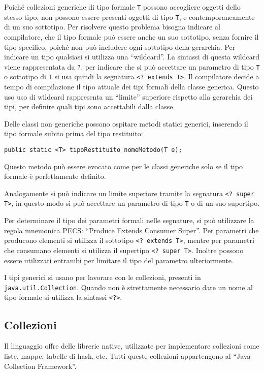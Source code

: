 \documentclass{article}
\numberwithin{equation}{subsection}
\begin{document}
Poiché collezioni generiche di tipo formale \verb|T| possono accogliere oggetti dello stesso tipo, non possono essere presenti oggetti di tipo \verb|T|, e contemporaneamente di un suo 
sottotipo. Per risolvere questo problema bisogna indicare al compilatore, che il tipo formale può essere anche un suo sottotipo, senza fornire il tipo specifico, poiché non può 
includere ogni sottotipo della gerarchia. Per indicare un tipo qualsiasi si utilizza una ``wildcard''. 
La sintassi di questa wildcard viene rappresentata da \verb|?|, per indicare che si può accettare un parametro di tipo \verb|T| o sottotipo di \verb|T| si usa quindi la 
segnatura \verb|<? extends T>|. 
Il compilatore decide a tempo di compilazione il tipo attuale dei tipi formali della classe generica. Questo uso uso di wildcard rappresenta un ``limite'' superiore 
rispetto alla gerarchia dei tipi, per definire quali tipi sono accettabili dalla classe. 

Delle classi non generiche possono ospitare metodi statici generici, inserendo il tipo formale subito prima del tipo restituito:
\begin{verbatim}
public static <T> tipoRestituito nomeMetodo(T e);
\end{verbatim}
Questo metodo può essere evocato come per le classi generiche solo se il tipo formale è perfettamente definito.  

Analogamente si può indicare un limite superiore tramite la segnatura \verb|<? super T>|, in questo modo si può accettare un parametro di tipo \verb|T| o di un suo 
supertipo. 

Per determinare il tipo dei parametri formali nelle segnature, si può utilizzare la regola mnemonica PECS: ``Produce Extends Consumer Super''. Per parametri che producono elementi 
si utilizza il sottotipo \verb|<? extends T>|, mentre per parametri che consumano elementi si utilizza il supertipo \verb|<? super T>|. 
Inoltre possono essere utilizzati entrambi per limitare il tipo del parametro ulteriormente. 

I tipi generici si usano per lavorare con le collezioni, presenti in \verb|java.util.Collection|. Quando non è strettamente necessario dare un nome al tipo formale si utilizza la 
sintassi \verb|<?>|. 

\subsection{Collezioni}

Il linguaggio offre delle librerie native, utilizzate per implementare collezioni come liste, mappe, tabelle di hash, etc. 
Tutti queste collezioni appartengono al ``Java Collection Framework''. 
\end{document}
